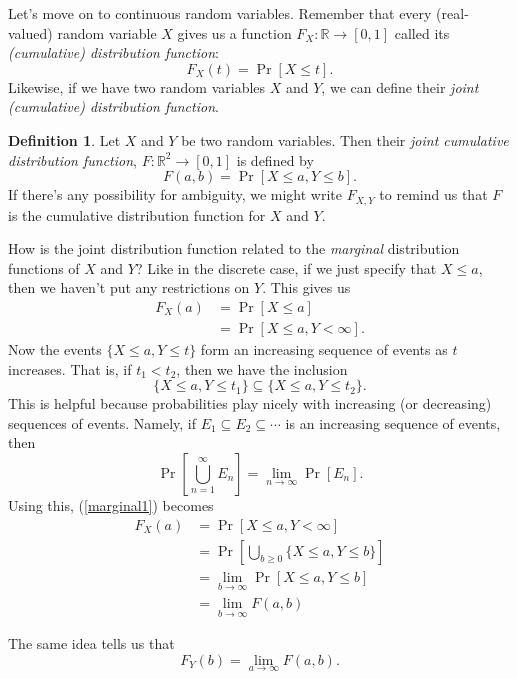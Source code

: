 \documentclass[12pt]{article}
\theoremstyle{plain}
\theoremstyle{definition}
\newtheorem{definition}[theorem]{Definition}
\theoremstyle{remark}
\newcommand{\R}{\mathbb{R}}
\begin{document}
Let's move on to continuous random variables.
Remember that every (real-valued) random variable $X$ gives us a function $F_X:\R\to [0,1]$ called its \emph{(cumulative) distribution function}:
\begin{equation}
    F_X(t) = \Pr[X \leq t].
\end{equation}
Likewise, if we have two random variables $X$ and $Y$, we can define their \emph{joint (cumulative) distribution function}.
\begin{definition}
    Let $X$ and $Y$ be two random variables.
    Then their \emph{joint cumulative distribution function}, $F: \R^2\to [0,1]$ is defined by
    \[
        F(a,b) = \Pr[X\leq a, Y\leq b].
    \]
    If there's any possibility for ambiguity, we might write $F_{X,Y}$ to remind us that $F$ is the cumulative distribution function for $X$ and $Y$.
\end{definition}

How is the joint distribution function related to the \emph{marginal} distribution functions of $X$ and $Y$?
Like in the discrete case, if we just specify that $X\leq a$, then we haven't put any restrictions on $Y$.
This gives us
\begin{equation}\label{marginal1}
\begin{split}
    F_X(a) &= \Pr[X\leq a]\\
    &= \Pr[X \leq a, Y<\infty].
\end{split}
\end{equation}
Now the events $\{X\leq a, Y\leq t\}$ form an increasing sequence of events as $t$ increases.
That is, if $t_1 < t_2$, then we have the inclusion
\[
    \{X\leq a, Y\leq t_1\} \subseteq \{X\leq a, Y\leq t_2\}.
\]
This is helpful because probabilities play nicely with increasing (or decreasing) sequences of events.
Namely, if $E_1 \subseteq E_2 \subseteq \cdots$ is an increasing sequence of events, then
\[
    \Pr\left[\bigcup_{n=1}^\infty E_n\right] = \lim_{n\to \infty}\Pr[E_n].
\]
Using this, (\ref{marginal1}) becomes
\begin{align*}
    F_X(a) &= \Pr[X \leq a, Y< \infty]\\
    &= \Pr\left[ \bigcup_{b\geq 0}\{X\leq a, Y\leq b\}\right]\\
    &= \lim_{b\to \infty}\Pr\left[X\leq a, Y\leq b\right]\\
    &= \lim_{b\to \infty}F(a,b)
\end{align*}

The same idea tells us that
\[
    F_Y(b) = \lim_{a\to \infty}F(a, b).
\]
\end{document}
